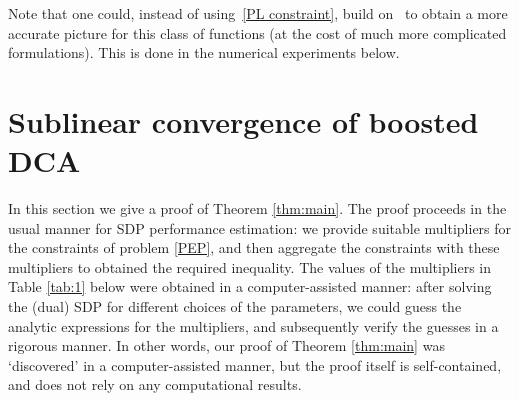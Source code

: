 \documentclass{article} %
\begin{document}
Note that one could, instead of using~\eqref{PL constraint}, build on~\cite[Proposition 3.4]{rubbens2025constructive} to obtain a more accurate picture for this class of functions (at the cost of much more complicated formulations). This is done in the numerical experiments below.

\section{Sublinear convergence of boosted DCA}
\label{sec:pep results}
In this section we give a proof of Theorem \ref{thm:main}.
The proof proceeds in the usual manner for SDP performance estimation: we provide suitable multipliers for the constraints
of problem \eqref{PEP}, and then aggregate the constraints with these multipliers to obtained the required inequality.
The values of the multipliers in Table \ref{tab:1} below were obtained in a computer-assisted manner: after solving the (dual) SDP for different choices of the parameters,
we could guess the analytic expressions for the multipliers, and subsequently verify the guesses in a rigorous manner. In other words, our proof of
Theorem \ref{thm:main} was `discovered' in a computer-assisted manner, but the proof itself is self-contained, and does not rely on any computational results.
\end{document}
